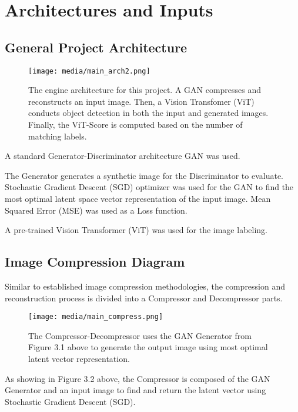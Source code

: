 \section{Architectures and Inputs}

\subsection{General Project Architecture}

\begin{figure}[H]
	\begin{center}
	\texttt{[image: media/main\_arch2.png]}
	\end{center}
	\caption[Model Architecture]{The engine architecture for this project. A GAN compresses and reconstructs
    an input image. Then, a Vision Transfomer (ViT) conducts object detection in both the input and generated images.
    Finally, the ViT-Score is computed based on the number of matching labels.}
	\end{figure}

A standard Generator-Discriminator architecture GAN was used. 

The Generator generates a synthetic image for the Discriminator to evaluate.
Stochastic Gradient Descent (SGD) optimizer was used for the GAN to find the most optimal latent space vector
representation of the input image.
Mean Squared Error (MSE) was used as a Loss function.

A pre-trained Vision Transformer (ViT) was used for the image labeling.


\subsection{Image Compression Diagram}

Similar to established image compression methodologies, the compression and reconstruction process 
is divided into a Compressor and Decompressor parts.

\begin{figure}[H]
	\begin{center}
	\texttt{[image: media/main\_compress.png]}
	\end{center}
	\caption[Compression Architecture]{The Compressor-Decompressor uses the GAN Generator from Figure 3.1 above 
    to generate the output image using most optimal latent vector representation.}
	\end{figure}

As showing in Figure 3.2 above, the Compressor is composed of the GAN Generator and an input image to find and return the latent vector using
Stochastic Gradient Descent (SGD).

